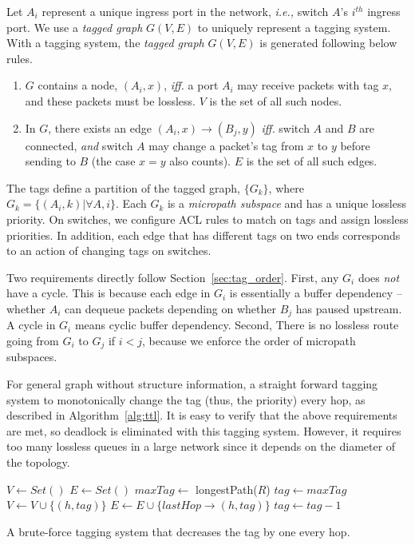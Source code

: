  Let $A_i$ represent a unique ingress port in the network, {\em i.e.,} switch $A$'s $i^{th}$ ingress port.
We use a {\em tagged graph} $G(V,E)$ to uniquely represent a tagging system.
With a tagging system, the {\em tagged graph} $G(V,E)$ is generated following below rules.

\begin{enumerate}
\item $G$ contains a node, $(A_i, x)$, {\em iff.} a port $A_i$ may receive packets with tag $x$, and these packets must 
be lossless. $V$ is the set of all such nodes.
\item In $G$, there exists an edge $(A_i, x)\rightarrow(B_j, y)$ {\em iff.} switch $A$ and $B$ are 
connected, {\em and} switch $A$ may change a packet's tag from $x$ to $y$ before sending to $B$ (the case $x=y$ also counts).
$E$ is the set of all such edges.
\end{enumerate}

The tags define a partition of the tagged graph, $\{G_k\}$, where $G_k = \{(A_i,
k) | \forall A, i\}$. Each $G_k$ is a {\em micropath subspace} and has a unique
lossless priority.  On switches, we configure ACL rules to match on tags and
assign lossless priorities.  In addition, each edge that has different tags on
two ends corresponds to an action of changing tags on switches.

Two requirements directly follow Section~\ref{sec:tag_order}. First, any $G_i$
does {\em not} have a cycle. This is because each edge in $G_i$ is essentially a
buffer dependency -- whether $A_i$ can dequeue packets depending on whether
$B_j$ has paused upstream. A cycle in $G_i$ means cyclic buffer dependency.
Second, There is no lossless route going from $G_i$ to $G_j$ if $i<j$, because
we enforce the order of micropath subspaces.


 For general graph without structure information, a straight forward tagging system
to monotonically change the tag (thus, the priority) every hop, as described in Algorithm~\ref{alg:ttl}. It is easy to 
verify that the above requirements are met, so deadlock is eliminated with this tagging system. However, it requires 
too many lossless queues in a large network since it depends on the diameter of the topology.

\begin{algorithm}
	\small
	$V \gets Set()$\;
	$E \gets Set()$\; 
	$maxTag \gets$ longestPath($R$)\;
	 {
		$tag \gets maxTag$\;
		 {
			$V \gets V \cup \{(h, tag)\}$\;
			$E \gets E \cup \{lastHop\rightarrow(h, tag)\}$\;
			$tag \gets tag-1$\;
		}
	}
	\;
    \caption{A brute-force tagging system that decreases the tag by one every hop.}
	\label{alg:ttl}
\end{algorithm}

